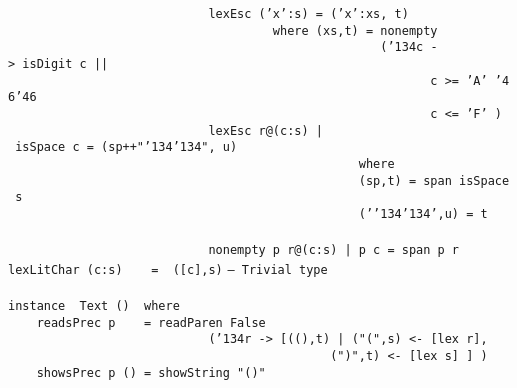 %
\eprogB\noindent\bprogB
\mbox{\tt \ \ \ \ \ \ \ \ \ \ \ \ \ \ \ \ \ \ \ \ \ \ \ \ \ \ \ \ lexEsc\ ('x':s)\ =\ ('x':xs,\ t)}\\
\mbox{\tt \ \ \ \ \ \ \ \ \ \ \ \ \ \ \ \ \ \ \ \ \ \ \ \ \ \ \ \ \ \ \ \ \ \ \ \ \ where\ (xs,t)\ =\ nonempty}\\
\mbox{\tt \ \ \ \ \ \ \ \ \ \ \ \ \ \ \ \ \ \ \ \ \ \ \ \ \ \ \ \ \ \ \ \ \ \ \ \ \ \ \ \ \ \ \ \ \ \ \ \ \ \ \ \ ({\char'134}c\ ->\ isDigit\ c\ ||}\\
\mbox{\tt \ \ \ \ \ \ \ \ \ \ \ \ \ \ \ \ \ \ \ \ \ \ \ \ \ \ \ \ \ \ \ \ \ \ \ \ \ \ \ \ \ \ \ \ \ \ \ \ \ \ \ \ \ \ \ \ \ \ \ c\ >=\ 'A'\ {\char'46}{\char'46}}\\
\mbox{\tt \ \ \ \ \ \ \ \ \ \ \ \ \ \ \ \ \ \ \ \ \ \ \ \ \ \ \ \ \ \ \ \ \ \ \ \ \ \ \ \ \ \ \ \ \ \ \ \ \ \ \ \ \ \ \ \ \ \ \ c\ <=\ 'F'\ )}\\
\mbox{\tt \ \ \ \ \ \ \ \ \ \ \ \ \ \ \ \ \ \ \ \ \ \ \ \ \ \ \ \ lexEsc\ r@(c:s)\ |\ isSpace\ c\ =\ (sp++"{\char'134}{\char'134}",\ u)}\\
\mbox{\tt \ \ \ \ \ \ \ \ \ \ \ \ \ \ \ \ \ \ \ \ \ \ \ \ \ \ \ \ \ \ \ \ \ \ \ \ \ \ \ \ \ \ \ \ \ \ \ \ \ where}\\
\mbox{\tt \ \ \ \ \ \ \ \ \ \ \ \ \ \ \ \ \ \ \ \ \ \ \ \ \ \ \ \ \ \ \ \ \ \ \ \ \ \ \ \ \ \ \ \ \ \ \ \ \ (sp,t)\ =\ span\ isSpace\ s}\\
\mbox{\tt \ \ \ \ \ \ \ \ \ \ \ \ \ \ \ \ \ \ \ \ \ \ \ \ \ \ \ \ \ \ \ \ \ \ \ \ \ \ \ \ \ \ \ \ \ \ \ \ \ ('{\char'134}{\char'134}',u)\ =\ t}\\
\mbox{\tt }\\
\mbox{\tt \ \ \ \ \ \ \ \ \ \ \ \ \ \ \ \ \ \ \ \ \ \ \ \ \ \ \ \ nonempty\ p\ r@(c:s)\ |\ p\ c\ =\ span\ p\ r}\\
\mbox{\tt lexLitChar\ (c:s)\ \ \ \ =\ \ ([c],s)}
\eprogB\noindent\bprogB
\mbox{\tt --\ Trivial\ type}\\
\mbox{\tt }\\
\mbox{\tt instance\ \ Text\ ()\ \ where}\\
\mbox{\tt \ \ \ \ readsPrec\ p\ \ \ \ =\ readParen\ False}\\
\mbox{\tt \ \ \ \ \ \ \ \ \ \ \ \ \ \ \ \ \ \ \ \ \ \ \ \ \ \ \ \ ({\char'134}r\ ->\ [((),t)\ |\ ("(",s)\ <-\ [lex\ r],}\\
\mbox{\tt \ \ \ \ \ \ \ \ \ \ \ \ \ \ \ \ \ \ \ \ \ \ \ \ \ \ \ \ \ \ \ \ \ \ \ \ \ \ \ \ \ \ \ \ \ (")",t)\ <-\ [lex\ s]\ ]\ )}\\
\mbox{\tt \ \ \ \ showsPrec\ p\ ()\ =\ showString\ "()"}

